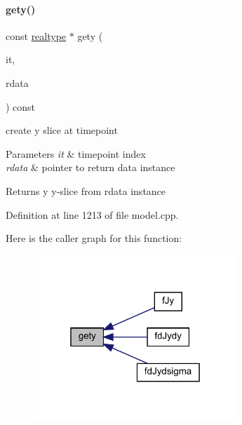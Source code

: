 \paragraph{\texorpdfstring{gety()}{gety()}}
{\footnotesize\ttfamily const \mbox{\hyperlink{namespaceamici_a1bdce28051d6a53868f7ccbf5f2c14a3}{realtype}} $\ast$ gety (\begin{DoxyParamCaption}\item[{const int}]{it,  }\item[{const \mbox{\hyperlink{classamici_1_1_return_data}{Return\+Data}} $\ast$}]{rdata }\end{DoxyParamCaption}) const\hspace{0.3cm}{\ttfamily [protected]}}

create y slice at timepoint 
\begin{DoxyParams}{Parameters}
{\em it} & timepoint index \\
\hline
{\em rdata} & pointer to return data instance \\
\hline
\end{DoxyParams}
\begin{DoxyReturn}{Returns}
y y-\/slice from rdata instance 
\end{DoxyReturn}


Definition at line 1213 of file model.\+cpp.

Here is the caller graph for this function\+:
\nopagebreak
\begin{figure}[H]
\begin{center}
\leavevmode
\includegraphics[width=217pt]{classamici_1_1_model_aee6c7b534a091180c01aabb3be44a216_icgraph}
\end{center}
\end{figure}
\mbox{\label{classamici_1_1_model_abefad4b8b4ba76bad66f57504affca9b}} 

